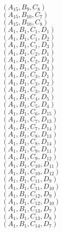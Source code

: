 \documentclass[14pt]{article}
\begin{document}
    $({A}_{15}, {B}_{9}, {C}_{8}) $ \\ 
    $({A}_{15}, {B}_{10}, {C}_{7}) $ \\ 
    $({A}_{15}, {B}_{10}, {C}_{8}) $ \\ 
    $({A}_{1}, {B}_{1}, {C}_{1}, {D}_{1}) $ \\ 
    $({A}_{1}, {B}_{1}, {C}_{1}, {D}_{2}) $ \\ 
    $({A}_{1}, {B}_{1}, {C}_{1}, {D}_{3}) $ \\ 
    $({A}_{1}, {B}_{1}, {C}_{2}, {D}_{1}) $ \\ 
    $({A}_{1}, {B}_{1}, {C}_{2}, {D}_{2}) $ \\ 
    $({A}_{1}, {B}_{1}, {C}_{2}, {D}_{3}) $ \\ 
    $({A}_{1}, {B}_{1}, {C}_{3}, {D}_{1}) $ \\ 
    $({A}_{1}, {B}_{1}, {C}_{3}, {D}_{2}) $ \\ 
    $({A}_{1}, {B}_{1}, {C}_{3}, {D}_{3}) $ \\ 
    $({A}_{1}, {B}_{1}, {C}_{4}, {D}_{5}) $ \\ 
    $({A}_{1}, {B}_{1}, {C}_{5}, {D}_{4}) $ \\ 
    $({A}_{1}, {B}_{1}, {C}_{6}, {D}_{15}) $ \\ 
    $({A}_{1}, {B}_{1}, {C}_{7}, {D}_{13}) $ \\ 
    $({A}_{1}, {B}_{1}, {C}_{7}, {D}_{14}) $ \\ 
    $({A}_{1}, {B}_{1}, {C}_{8}, {D}_{13}) $ \\ 
    $({A}_{1}, {B}_{1}, {C}_{8}, {D}_{14}) $ \\ 
    $({A}_{1}, {B}_{1}, {C}_{9}, {D}_{11}) $ \\ 
    $({A}_{1}, {B}_{1}, {C}_{9}, {D}_{12}) $ \\ 
    $({A}_{1}, {B}_{1}, {C}_{10}, {D}_{11}) $ \\ 
    $({A}_{1}, {B}_{1}, {C}_{10}, {D}_{12}) $ \\ 
    $({A}_{1}, {B}_{1}, {C}_{11}, {D}_{9}) $ \\ 
    $({A}_{1}, {B}_{1}, {C}_{11}, {D}_{10}) $ \\ 
    $({A}_{1}, {B}_{1}, {C}_{12}, {D}_{9}) $ \\ 
    $({A}_{1}, {B}_{1}, {C}_{12}, {D}_{10}) $ \\ 
    $({A}_{1}, {B}_{1}, {C}_{13}, {D}_{7}) $ \\ 
    $({A}_{1}, {B}_{1}, {C}_{13}, {D}_{8}) $ \\ 
    $({A}_{1}, {B}_{1}, {C}_{14}, {D}_{7}) $ \\ 
\end{document}

